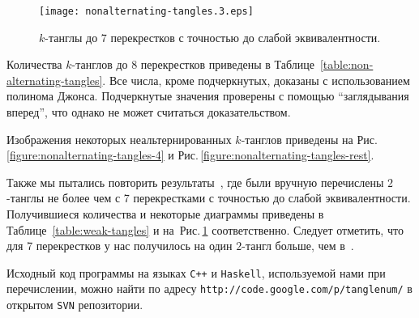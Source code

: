 \documentclass[12pt]{article}
\theoremstyle{plain}
\theoremstyle{definition}
\def\figureref#1{Рис.\,\protect\ref{#1}}
\begin{document}
		\begin{figure}[ht]
			\centering
			\texttt{[image: nonalternating-tangles.3.eps]}
			\caption{\footnotesize $k$-танглы до 7 перекрестков с точностью до слабой эквивалентности.\label{figure:weak-tangles-7}}
		\end{figure}

		Количества $k$-танглов до 8 перекрестков приведены в Таблице~\ref{table:non-alternating-tangles}. Все числа, кроме подчеркнутых,
		доказаны с использованием полинома Джонса. Подчеркнутые значения проверены с помощью ``заглядывания вперед'', что однако не
		может считаться доказательством.

		Изображения некоторых неальтернированных $k$-танглов приведены на \figureref{figure:nonalternating-tangles-4} и
		\figureref{figure:nonalternating-tangles-rest}.

		Также мы пытались повторить результаты~\cite{KanenobuSaitoSatoh2003}, где были вручную перечислены $2$-танглы не более чем
		с 7 перекрестками с точностью до слабой эквивалентности. Получившиеся количества и некоторые диаграммы приведены в
		Таблице~\ref{table:weak-tangles} и на~\figureref{figure:weak-tangles-7} соответственно. Следует отметить, что для 7
		перекрестков у нас получилось на один $2$-тангл больше, чем в~\cite{KanenobuSaitoSatoh2003}.

		Исходный код программы на языках \texttt{C++} и \texttt{Haskell}, используемой нами при перечислении, можно найти по адресу
		\texttt{http://code.google.com/p/tanglenum/} в открытом \texttt{SVN} репозитории.
\end{document}
